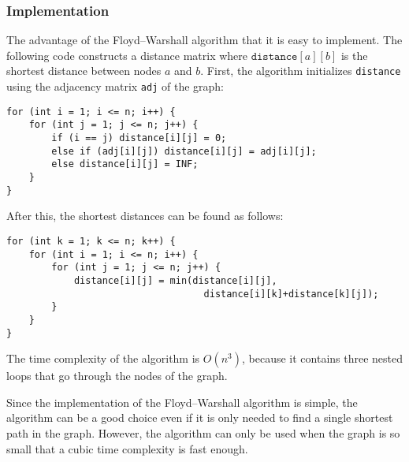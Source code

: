 \subsubsection{Implementation}

The advantage of the
Floyd–Warshall algorithm that it is
easy to implement.
The following code constructs a
distance matrix where $\texttt{distance}[a][b]$
is the shortest distance between nodes $a$ and $b$.
First, the algorithm initializes \texttt{distance}
using the adjacency matrix \texttt{adj} of the graph:

\begin{lstlisting}
for (int i = 1; i <= n; i++) {
    for (int j = 1; j <= n; j++) {
        if (i == j) distance[i][j] = 0;
        else if (adj[i][j]) distance[i][j] = adj[i][j];
        else distance[i][j] = INF;
    }
}
\end{lstlisting}
After this, the shortest distances can be found as follows:
\begin{lstlisting}
for (int k = 1; k <= n; k++) {
    for (int i = 1; i <= n; i++) {
        for (int j = 1; j <= n; j++) {
            distance[i][j] = min(distance[i][j],
                                   distance[i][k]+distance[k][j]);
        }
    }
}
\end{lstlisting}

The time complexity of the algorithm is $O(n^3)$,
because it contains three nested loops
that go through the nodes of the graph.

Since the implementation of the Floyd–Warshall
algorithm is simple, the algorithm can be
a good choice even if it is only needed to find a
single shortest path in the graph.
However, the algorithm can only be used when the graph
is so small that a cubic time complexity is fast enough.
